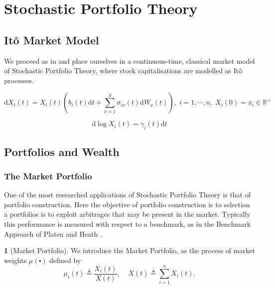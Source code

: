 \documentclass[british]{amsart}
\numberwithin{equation}{section}
\numberwithin{figure}{section}
\theoremstyle{plain}
\theoremstyle{definition}
\newtheorem{defn}[thm]{\protect\definitionname}
\theoremstyle{plain}
\theoremstyle{plain}
\theoremstyle{plain}
\providecommand{\definitionname}{Definition}
\begin{document}
\section{Stochastic Portfolio Theory}

\subsection{It\^{o} Market Model}

We proceed as in \cite{karatzas2009} and place ourselves in a continuous-time, 
classical market model of Stochastic Portfolio Theory, where stock 
capitalisations are modelled as It\^{o} processes.

\renewcommand{\d}[1]{\mathrm{d}{#1}}
\newcommand{\realnumbers}{\mathbb{R}}

\begin{equation}
\d{X_{i}(t)} = X_{i}(t) \left( b_{i}(t)\d{t} + \sum_{\nu=1}^{d} 
\sigma_{i\nu}(t){\d{W_{\nu}(t)}} \right), 
\;i=1,\cdots,n,\;X_{i}(0)=x_{i}\in\realnumbers^{+}
\end{equation}

\begin{equation}
	\mathrm{d}{\log X_{i}(t)}=\gamma_{i}(t)\mathrm{d}t
\end{equation}

\subsection{Portfolios and Wealth}

\subsubsection{The Market Portfolio}
One of the most researched applications of Stochastic Portfolio Theory is that 
of portfolio construction. Here the objective of portfolio construction is to 
selection a portfolios is to exploit arbitrages that may be present in the 
market. Typically this performance is measured with respect to a benchmark, as 
in the Benchmark Approach of Platen and Heath \cite{platen2006}.

\begin{defn}[Market Portfolio]
We introduce the Market Portfolio, as the process of market weights 
$\mu(\centerdot)$ defined by \begin{equation}
	\mu_{i}(t)\triangleq\frac{X_{i}(t)}{X(t)},\;\;\;\;X(t)\triangleq\sum_{i=1}^{n}X_{i}(t).
\end{equation}
\end{defn}
\end{document}
